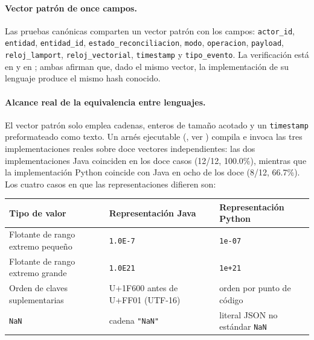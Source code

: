 \documentclass[11pt,a4paper]{article}
\begin{document}
\paragraph{Vector patr\'on de once campos.}
Las pruebas can\'onicas comparten un vector patr\'on con los campos:
\texttt{actor\_id}, \texttt{entidad}, \texttt{entidad\_id},
\texttt{estado\_reconciliacion}, \texttt{modo}, \texttt{operacion},
\texttt{payload}, \texttt{reloj\_lamport}, \texttt{reloj\_vectorial},
\texttt{timestamp} y \texttt{tipo\_evento}. La verificaci\'on est\'a en
 y en
;
ambas afirman que, dado el mismo vector, la implementaci\'on de su
lenguaje produce el mismo hash conocido.

\paragraph{Alcance real de la equivalencia entre lenguajes.}
El vector patr\'on solo emplea cadenas, enteros de tama\~no acotado y
un \texttt{timestamp} preformateado como texto. Un arn\'es ejecutable
(, ver
) compila e invoca las tres
implementaciones reales sobre doce vectores independientes: las dos
implementaciones Java coinciden en los doce casos (12/12, 100.0\%),
mientras que la implementaci\'on Python coincide con Java en ocho de
los doce (8/12, 66.7\%). Los cuatro casos en que las representaciones
difieren son:

\begin{tabular}{l|l|l}
\hline
Tipo de valor & Representaci\'on Java & Representaci\'on Python \\
\hline
Flotante de rango extremo peque\~no & \texttt{1.0E-7} & \texttt{1e-07} \\
Flotante de rango extremo grande & \texttt{1.0E21} & \texttt{1e+21} \\
Orden de claves suplementarias & U+1F600 antes de U+FF01 (UTF-16) & orden por punto de c\'odigo \\
\texttt{NaN} & cadena \texttt{"NaN"} & literal JSON no est\'andar \texttt{NaN} \\
\hline
\end{tabular}
\end{document}
